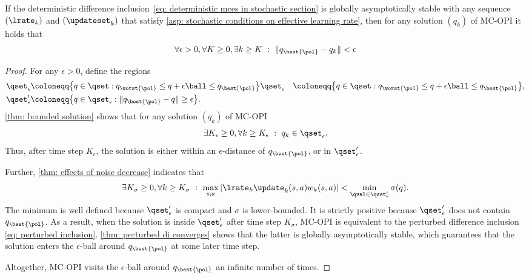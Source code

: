 \begin{lemma}
\label{thm: get arbitrarily close}
    If the deterministic difference inclusion~\eqref{eq: deterministic mces in stochastic section} is globally asymptotically stable
    with any sequence $(\lrate_k)$ and $(\updateset_k)$ that satisfy \autoref{asp: stochastic conditions on effective learning rate},
    then for any solution $(q_k)$ of MC-OPI it holds that
    \begin{align}
        \forall \epsilon>0, \forall K \geq 0, \exists k \geq K
        \ : \
        \| q_{\best{\pol}} - q_k \| < \epsilon
    \end{align}
\end{lemma}
\begin{proof}
For any $\epsilon>0$, define the regions
\begin{align*}
    \qset_{\epsilon}
    &\coloneqq
    \big\{ q \in \qset :
    q_{\worst{\pol}} \leq q + \epsilon \ball \leq q_{\best{\pol}} \big\}
    \qset_{\epsilon}
    &\coloneqq
    \big\{ q \in \qset :
    q_{\worst{\pol}} \leq q + \epsilon \ball \leq q_{\best{\pol}} \big\},
    \\
    \qset'_{\epsilon}
    &\coloneqq
    \big\{ q \in \qset_\epsilon : \|q_{\best{\pol}} - q\| \geq \epsilon \big\}.
\end{align*}
\autoref{thm: bounded solution} shows that for any solution $(q_k)$ of MC-OPI
\begin{align}
    \exists K_\epsilon \geq 0, \forall k \geq K_\epsilon 
    \ : \ 
    q_k \in \qset_{\epsilon} .
\end{align}
Thus, after time step $K_\epsilon$, the solution is either within an $\epsilon$-distance of $q_{\best{\pol}}$,
or in $\qset'_\epsilon$.

Further, \autoref{thm: effects of noise decrease} indicates that
\begin{align}
    \exists K_\sigma \geq 0, \forall k \geq K_\sigma 
    \ : \
    \max_{s,a} | \lrate_k \update_k(s,a) w_k(s,a) | < \min_{\qval \in \qset'_{\epsilon}} \sigma(q) .
\end{align}
The minimum is well defined because $\qset'_\epsilon$ is compact and $\sigma$ is lower-bounded. It is strictly positive because $\qset'_\epsilon$ does not contain $q_{\best{\pol}}$.
As a result, when the solution is inside $\qset'_\epsilon$ after time step $K_\sigma$, MC-OPI is equivalent to the perturbed difference inclusion \eqref{eq: perturbed inclusion}.
\autoref{thm: perturbed di converges} shows that the latter is globally asymptotically stable, which guarantees that the solution enters the $\epsilon$-ball around $q_{\best{\pol}}$ at some later time step.

Altogether, MC-OPI visits the $\epsilon$-ball around $q_{\best{\pol}}$ an infinite number of times.

\end{proof}